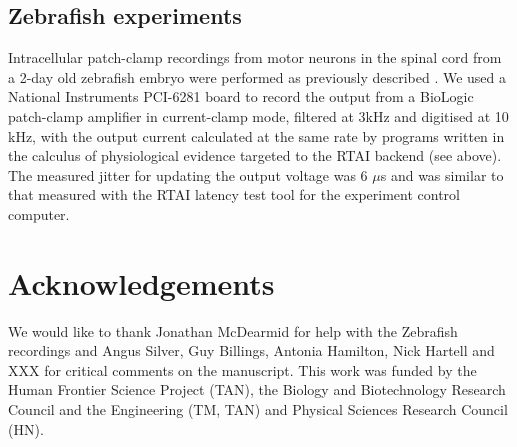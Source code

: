 \subsection*{Zebrafish experiments}

Intracellular patch-clamp recordings from motor neurons in the spinal
cord from a 2-day old zebrafish embryo were performed as previously
described \citep{McDearmid2006}. We used a National Instruments PCI-6281 board to
record the output from a BioLogic patch-clamp amplifier in
current-clamp mode, filtered at 3kHz and digitised at 10 kHz, with the
output current calculated at the same rate by programs written in the
calculus of physiological evidence targeted to the RTAI backend (see
above). The measured jitter for updating the output voltage was 6
$\mu$s and was similar to that measured with the RTAI latency test
tool for the experiment control computer.

\section*{Acknowledgements}
We would like to thank Jonathan McDearmid for help with the Zebrafish
recordings and Angus Silver, Guy Billings, Antonia Hamilton, Nick Hartell
and XXX for critical comments on the manuscript. This work was funded
by the Human Frontier Science Project (TAN), the Biology and Biotechnology
Research Council and the Engineering (TM, TAN) and Physical Sciences Research
Council (HN).




